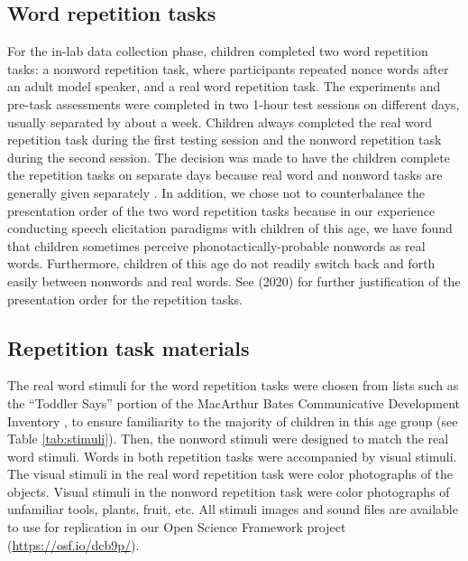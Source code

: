 \documentclass[a4paper,man,natbib,donotrepeattitle, apacite]{apa6}
\begin{document}
\subsection{Word repetition tasks}

For the in-lab data collection phase, children completed two word repetition tasks: a nonword repetition task, where participants repeated nonce words after an adult model speaker, and a real word repetition task. The experiments and pre-task assessments were completed in two 1-hour test sessions on different days, usually separated by about a week. Children always completed the real word repetition task during the first testing session and the nonword repetition task during the second session. The decision was made to have the children complete the repetition tasks on separate days because real word and nonword tasks are generally given separately \cite{chiatPreschoolRepetitionTest2007}. In addition, we chose not to counterbalance the presentation order of the two word repetition tasks because in our experience conducting speech elicitation paradigms with children of this age, we have found that children sometimes perceive phonotactically-probable nonwords as real words. Furthermore, children of this age do not readily switch back and forth easily between nonwords and real words. See \citeauthor{cychoszLexicalAdvantageFouryearold2020}(2020) for further justification of the presentation order for the repetition tasks. 

\subsection{Repetition task materials}

The real word stimuli for the word repetition tasks were chosen from lists such as the ``Toddler Says'' portion of the MacArthur Bates Communicative Development Inventory \cite{fensonMacArthurBatesCommunicativeDevelopment2007}, to ensure familiarity to the majority of children in this age group (see Table \ref{tab:stimuli}). Then, the nonword stimuli were designed to match the real word stimuli. Words in both repetition tasks were accompanied by visual stimuli. The visual stimuli in the real word repetition task were color photographs of the objects. Visual stimuli in the nonword repetition task were color photographs of unfamiliar tools, plants, fruit, etc. All stimuli images and sound files are available to use for replication in our Open Science Framework project (\url{https://osf.io/dcb9p/}). 
\end{document}
